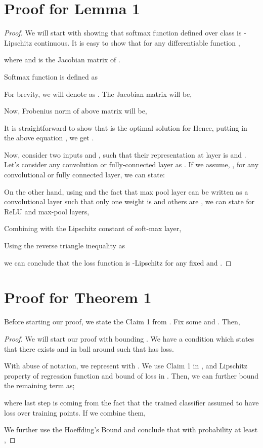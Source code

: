\documentclass{article} \usepackage{iclr2018_conference,times}
\begin{document}
\section{Proof for Lemma 1}
\begin{proof}
We will start with showing that softmax function defined over  class is -Lipschitz continuous. It is easy to show that for any differentiable function \mbox{},


where  and  is the Jacobian matrix of .

Softmax function is defined as

For brevity, we will denote  as . The Jacobian matrix will be,

Now, Frobenius norm of above matrix will be,

It is straightforward to show that  is the optimal solution for  Hence, putting  in the above equation , we get \mbox{}.

Now, consider two inputs  and , such that their representation at layer  is  and . Let's consider any convolution or fully-connected layer as . If we assume, \mbox{}, for any convolutional or fully connected layer, we can state:
 
On the other hand, using  and the fact that max pool layer can be written as a convolutional layer such that only one weight is  and others are , we can state for ReLU and max-pool layers,
 

Combining with the Lipschitz constant of soft-max layer,

Using the reverse triangle inequality as

we can conclude that the loss function is -Lipschitz for any fixed  and .
\end{proof}

\section{Proof for Theorem 1}
Before starting our proof, we state the Claim 1 from \cite{BerlindU15}. Fix some  and . Then,

\begin{proof}
We will start our proof with bounding . We have a condition which states that there exists and  in  ball around  such that  has  loss.

With abuse of notation, we represent \mbox{} with \mbox{}. We use Claim 1 in , and Lipschitz property of regression function and bound of loss in . Then, we can further bound the remaining term as; 

where last step is coming from the fact that the trained classifier assumed to have  loss over training points. If we combine them,

We further use the Hoeffding's Bound and conclude that with probability at least ,

\end{proof}
\end{document}

